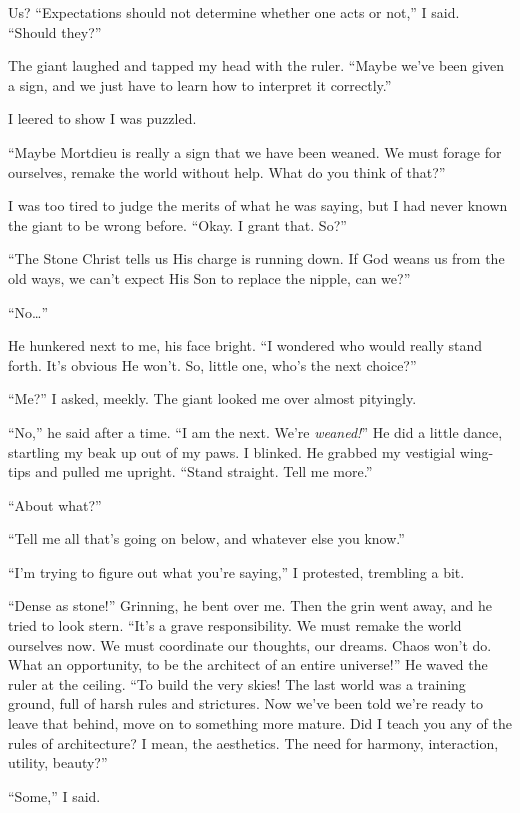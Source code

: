 Us? ``Expectations should not determine whether one acts or not,'' I said. ``Should they?''

The giant laughed and tapped my head with the ruler. ``Maybe we've been given a sign, and we just have to learn how to interpret it correctly.''

I leered to show I was puzzled.

``Maybe Mortdieu is really a sign that we have been weaned. We must forage for ourselves, remake the world without help. What do you think of that?''

I was too tired to judge the merits of what he was saying, but I had never known the giant to be wrong before. ``Okay. I grant that. So?''

``The Stone Christ tells us His charge is running down. If God weans us from the old ways, we can't expect His Son to replace the nipple, can we?''

``No\ldots''

He hunkered next to me, his face bright. ``I wondered who would really stand forth. It's obvious He won't. So, little one, who's the next choice?''

``Me?'' I asked, meekly. The giant looked me over almost pityingly.

``No,'' he said after a time. ``I am the next. We're \textit{weaned!}'' He did a little dance, startling my beak up out of my paws. I blinked. He grabbed my vestigial wing-tips and pulled me upright. ``Stand straight. Tell me more.''

``About what?''

``Tell me all that's going on below, and whatever else you know.''

``I'm trying to figure out what you're saying,'' I protested, trembling a bit.

``Dense as stone!'' Grinning, he bent over me. Then the grin went away, and he tried to look stern. ``It's a grave responsibility. We must remake the world ourselves now. We must coordinate our thoughts, our dreams. Chaos won't do. What an opportunity, to be the architect of an entire universe!'' He waved the ruler at the ceiling. ``To build the very skies! The last world was a training ground, full of harsh rules and strictures. Now we've been told we're ready to leave that behind, move on to something more mature. Did I teach you any of the rules of architecture? I mean, the aesthetics. The need for harmony, interaction, utility, beauty?''

``Some,'' I said.


